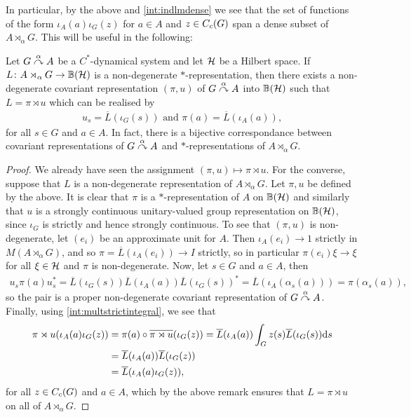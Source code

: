 \begin{remark}
In particular, by the above and \cref{int:indlmdense} we see that the set of functions of the form $\iota_A(a) \iota_G(z)$ for $a \in A$ and $z \in C_c(G)$ span a dense subset of $A \rtimes_\alpha G$. This will be useful in the following:
\end{remark}
\begin{theorem}
	Let $G \stackrel{\alpha}{\curvearrowright} A$ be a $C ^*$-dynamical system and let $\mathcal{H}$ be a Hilbert space. If $L \colon A \rtimes_\alpha G \to \mathbb{B}(\mathcal{H})$ is a non-degenerate $*$-representation, then there exists a non-degenerate covariant representation $(\pi,u)$ of $G \stackrel{\alpha}{\curvearrowright} A$ into $ \mathbb{B}(\mathcal{H})$ such that $L= \pi \rtimes u$ which can be realised by 
	\begin{align*}
		u_s = \overline L(\iota_G(s)) \text{ and } \pi(a) = \overline L(\iota_A(a)),
	\end{align*}
	for all $s \in G$ and $a \in A$. In fact, there is a bijective correspondance between covariant representations of $G \stackrel{\alpha}{\curvearrowright} A$ and $*$-representations of $A \rtimes_\alpha G$.
\end{theorem}
\begin{proof}
	We already have seen the assignment $(\pi,u) \mapsto \pi \rtimes u$. For the converse, suppose that $L$ is a non-degenerate representation of $A \rtimes_\alpha G$. Let $\pi, u$ be defined by the above. It is clear that $\pi$ is a $*$-representation of $A$ on $\mathbb{B}(\mathcal{H})$ and similarly that $u$ is a strongly continuous unitary-valued group representation on $\mathbb{B}(\mathcal{H})$, since $\iota_G$ is strictly and hence strongly continuous. To see that $(\pi,u)$ is non-degenerate, let $(e_i)$ be an approximate unit for $A$. Then $\iota_A(e_i) \to 1$ strictly in $M(A \rtimes_\alpha G)$, and so $\pi = \overline L(\iota_A(e_i)) \to I$ strictly, so in particular $\pi(e_i) \xi \to \xi$ for all $\xi \in \mathcal{H}$ and $\pi$ is non-degenerate. Now, let $s \in G$ and $a \in A$, then
	\begin{align*}
		u_s \pi(a) u_s^* = \overline L(\iota_G(s) ) \overline L (\iota_A(a)) \overline L(\iota_G(s))^* = \overline L( \iota_A(\alpha_s(a))) = \pi(\alpha_{s}(a)),
	\end{align*}
	so the pair is a proper non-degenerate covariant representation of $G \stackrel{\alpha}{\curvearrowright} A$. Finally, using \cref{int:multstrictintegral}, we see that
\begin{align*}
	\pi \rtimes u(\iota_A(a) \iota_G(z)) &= \pi(a) \circ \overline{\pi \rtimes u}(\iota_G(z)) = \overline L(\iota_A(a)) \int_G z(s) \overline L(\iota_G(s)) \mathrm{d} s \\
	&= \overline L(\iota_A(a)) \overline L(\iota_G(z)) \\
	&= \overline L(\iota_A(a) \iota_G(z)),
\end{align*}
for all $z \in C_c(G)$ and $a \in A$, which by the above remark ensures that $L = \pi \rtimes u$ on all of $A \rtimes_ \alpha G$.
\end{proof}


